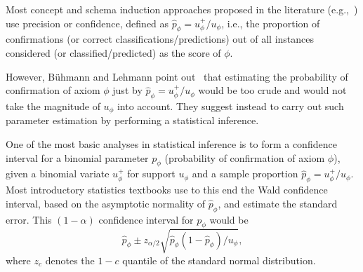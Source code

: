 \documentclass[conference]{IEEEtran}
\begin{document}

Most concept and schema induction approaches proposed in the literature
(e.g.,~\cite{FanizziDAmatoEsposito2008,FleischhackerVoelkerStuckenschmidt2012,HellmannLehmannAuer2009})
use precision or confidence, defined as $\hat{p}_\phi = u_\phi^+/u_\phi$, i.e.,
the proportion of confirmations (or correct classifications/predictions) out of
all instances considered (or classified/predicted) as the score of $\phi$.

However, B\"uhmann and Lehmann point out~\cite{BuehmannLehmann2012} that
estimating the probability of confirmation of axiom $\phi$ just by $\hat{p}_\phi = u_\phi^+/u_\phi$
would be too crude and would not take the magnitude of $u_\phi$ into account.
They suggest instead to carry out such parameter estimation by performing a statistical inference.

One of the most basic analyses in statistical inference is to form a confidence interval
for a binomial parameter $p_\phi$ (probability of confirmation of axiom $\phi$), given
a binomial variate $u_\phi^+$ for support $u_\phi$ and a sample proportion $\hat{p}_\phi = u_\phi^+/u_\phi$.
Most introductory statistics textbooks use to this end the Wald confidence interval,
based on the asymptotic normality of $\hat{p}_\phi$, and estimate the standard error.
This $(1 - \alpha)$ confidence interval for $p_\phi$ would be
\begin{equation}\label{eq:Wald}
  \hat{p}_\phi \pm z_{\alpha/2}\sqrt{\hat{p}_\phi(1 - \hat{p}_\phi)/u_\phi},
\end{equation}
where $z_c$ denotes the $1 - c$ quantile of the standard normal distribution.
\end{document}
